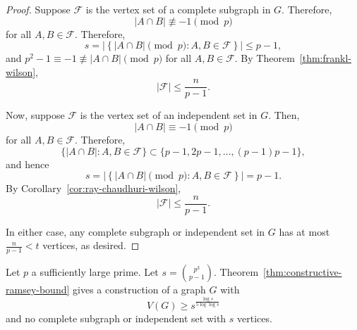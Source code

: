 \begin{proof}
    Suppose \(\mathcal{F}\) is the vertex set of a complete subgraph in \(G\).
    Therefore,
    \begin{equation}
        |A \cap B| \not \equiv -1 \pmod{p}
    \end{equation}
    for all \(A, B \in \mathcal{F}\).
    Therefore,
    \begin{equation}
        s = \left|
            \left\{
                |A \cap B| \pmod{p} : A, B \in \mathcal{F}
            \right\}
        \right|
        \leq p-1,
    \end{equation}
    and \(p^2 - 1 \equiv -1 \not \equiv |A \cap B| \pmod{p}\) for all \(A, B \in \mathcal{F}\).
    By Theorem~\ref{thm:frankl-wilson},
    \begin{equation}
        |\mathcal{F}| \leq \frac{n}{p-1}.
    \end{equation}

    Now, suppose \(\mathcal{F}\) is the vertex set of an independent set in \(G\).
    Then,
    \begin{equation}
        |A \cap B| \equiv -1 \pmod{p}
    \end{equation}
    for all \(A, B \in \mathcal{F}\).
    Therefore,
    \begin{equation}
        \{ |A \cap B| : A, B \in \mathcal{F} \} 
        \subset
        \{ p-1, 2p-1, \dots, (p-1)p - 1 \},
    \end{equation}
    and hence
    \begin{equation}
        s = \left|
            \left\{
                |A \cap B| \pmod{p} : A, B \in \mathcal{F}
            \right\}
        \right|
        = p-1.
    \end{equation}
    By Corollary~\ref{cor:ray-chaudhuri-wilson},
    \begin{equation}
        |\mathcal{F}| \leq \frac{n}{p-1}.
    \end{equation}

    In either case, any complete subgraph or independent set in \(G\) has at most \(\frac{n}{p-1} < t\) vertices, as desired.
\end{proof}

\begin{corollary}
    Let \(p\) a sufficiently large prime.
    Let \(s = \binom{p^3}{p - 1}\).
    Theorem~\ref{thm:constructive-ramsey-bound}
    gives a construction of a graph \(G\) with
    \begin{equation}
        V(G) \geq s^{\frac{\log s}{5 \log \log s}}
    \end{equation}
    and no complete subgraph or independent set with \(s\) vertices.
\end{corollary}

